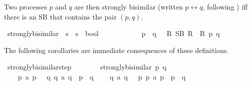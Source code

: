 \begin{isabellebody}
\begin{isamarkuptext}%
Two processes $p$ and $q$ are then strongly bisimilar (written $p \leftrightarrow q$, following \cite{rbs}) iff there is an SB that contains the pair $(p, q)$.%
\end{isamarkuptext}\isamarkuptrue%
\isamarkupfalse%
\ strongly{\isacharunderscore}{\kern0pt}bisimilar\ {\isacharcolon}{\kern0pt}{\isacharcolon}{\kern0pt}\ {\isacartoucheopen}{\isacharprime}{\kern0pt}s\ {\isasymRightarrow}\ {\isacharprime}{\kern0pt}s\ {\isasymRightarrow}\ bool{\isacartoucheclose}\ \isanewline
\ \ {\isacharparenleft}{\kern0pt}{\isacartoucheopen}{\isacharunderscore}{\kern0pt}\ {\isasymleftrightarrow}\ {\isacharunderscore}{\kern0pt}{\isacartoucheclose}\ {\isacharbrackleft}{\kern0pt}{}{}{\isacharcomma}{\kern0pt}\ {}{}{\isacharbrackright}{\kern0pt}\ {}{}{\isacharparenright}{\kern0pt}\isanewline
\ \ \ {\isacartoucheopen}p\ {\isasymleftrightarrow}\ q\ {\isasymequiv}\ {\isasymexists}\ R{\isachardot}{\kern0pt}\ SB\ R\ {\isasymand}\ R\ p\ q{\isacartoucheclose}%
\begin{isamarkuptext}%
The following corollaries are immediate consequences of these definitions.%
\end{isamarkuptext}\isamarkuptrue%
\isamarkupfalse%
\ strongly{\isacharunderscore}{\kern0pt}bisimilar{\isacharunderscore}{\kern0pt}step{\isacharcolon}{\kern0pt}\isanewline
\ \ \ \isanewline
\ \ \ \ {\isacartoucheopen}strongly{\isacharunderscore}{\kern0pt}bisimilar\ p\ q{\isacartoucheclose}\isanewline
\ \ \isanewline
\ \ \ \ {\isacartoucheopen}p\ {\isasymlongmapsto}a\ p{\isacharprime}{\kern0pt}\ {\isasymLongrightarrow}\ {\isacharparenleft}{\kern0pt}{\isasymexists}\ q{\isacharprime}{\kern0pt}{\isachardot}{\kern0pt}\ {\isacharparenleft}{\kern0pt}q\ {\isasymlongmapsto}a\ q{\isacharprime}{\kern0pt}{\isacharparenright}{\kern0pt}\ {\isasymand}\ p{\isacharprime}{\kern0pt}\ {\isasymleftrightarrow}\ q{\isacharprime}{\kern0pt}{\isacharparenright}{\kern0pt}{\isacartoucheclose}\isanewline
\ \ \ \ {\isacartoucheopen}q\ {\isasymlongmapsto}a\ q{\isacharprime}{\kern0pt}\ {\isasymLongrightarrow}\ {\isacharparenleft}{\kern0pt}{\isasymexists}\ p{\isacharprime}{\kern0pt}{\isachardot}{\kern0pt}\ {\isacharparenleft}{\kern0pt}p\ {\isasymlongmapsto}a\ p{\isacharprime}{\kern0pt}{\isacharparenright}{\kern0pt}\ {\isasymand}\ p{\isacharprime}{\kern0pt}\ {\isasymleftrightarrow}\ q{\isacharprime}{\kern0pt}{\isacharparenright}{\kern0pt}{\isacartoucheclose}\isanewline

\end{isabellebody}
